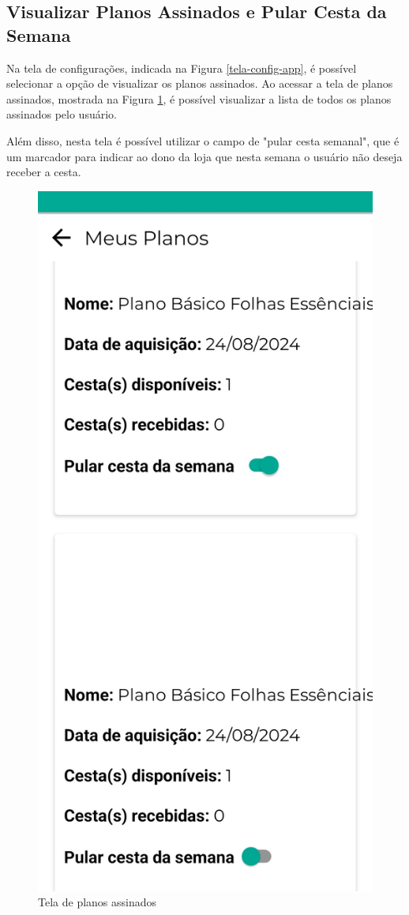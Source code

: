 \subsection{Visualizar Planos Assinados e Pular Cesta da Semana}
Na tela de configurações, indicada na Figura \ref{tela-config-app}, é possível selecionar a opção de visualizar os planos assinados. Ao acessar a tela de planos assinados, mostrada na Figura \ref{tela-planos-assinados-app}, é possível visualizar a lista de todos os planos assinados pelo usuário.

Além disso, nesta tela é possível utilizar o campo de "pular cesta semanal", que é um marcador para indicar ao dono da loja que nesta semana o usuário não deseja receber a cesta.

\begin{figure}[h]
	\centering
	\includegraphics[keepaspectratio=true,scale=0.16]{figuras/planos_assinados.jpg}
	\caption{Tela de planos assinados}
        \label{tela-planos-assinados-app}
\end{figure}
